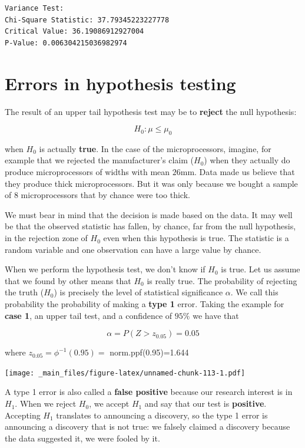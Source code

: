 \documentclass[
]{book}
\begin{document}
\begin{verbatim}
Variance Test:
Chi-Square Statistic: 37.79345223227778
Critical Value: 36.19086912927004
P-Value: 0.006304215036982974
\end{verbatim}

\hypertarget{errors-in-hypothesis-testing}{%
\section{Errors in hypothesis testing}\label{errors-in-hypothesis-testing}}

The result of an upper tail hypothesis test may be to \textbf{reject} the null hypothesis:

\[H_0: \mu\leq\mu_0\]

when \(H_0\) is actually \textbf{true}. In the case of the microprocessors, imagine, for example that we rejected the manufacturer's claim (\(H_0\)) when they actually do produce microprocessors of widths with mean \(26\)mm. Data made us believe that they produce thick microprocessors. But it was only because we bought a sample of \(8\) microprocessors that by chance were too thick.

We must bear in mind that the decision is made based on the data. It may well be that the observed statistic has fallen, by chance, far from the null hypothesis, in the rejection zone of \(H_0\) even when this hypothesis is true. The statistic is a random variable and one observation can have a large value by chance.

When we perform the hypothesis test, we don't know if \(H_0\) is true. Let us assume that we found by other means that \(H_0\) is really true. The probability of rejecting the truth (\(H_0\)) is precisely the level of statistical significance \(\alpha\). We call this probability the probability of making a \textbf{type 1} error. Taking the example for \textbf{case 1}, an upper tail test, and a confidence of \(95\%\) we have that

\[\alpha = P(Z> z_{0.05})=0.05\]

where \(z_{0.05}=\phi^{-1}(0.95)=\) norm.ppf(0.95)=1.644

\texttt{[image: \_main\_files/figure-latex/unnamed-chunk-113-1.pdf]}

A type 1 error is also called a \textbf{false positive} because our research interest is in \(H_1\). When we reject \(H_0\), we accept \(H_1\) and say that our test is \textbf{positive}. Accepting \(H_1\) translates to announcing a discovery, so the type 1 error is announcing a discovery that is not true: we falsely claimed a discovery because the data suggested it, we were fooled by it.
\end{document}
